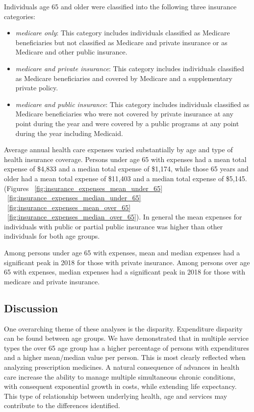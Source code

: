 \documentclass{ucetd}
\begin{document}
Individuals age 65 and older were classified into the following three insurance categories:
\begin{itemize}
  \item \textit{medicare only}: This category includes individuals classified as Medicare beneficiaries but not classified as Medicare and private insurance or as Medicare and other public insurance.
  \item \textit{medicare and private insurance}: This category includes individuals classified as Medicare beneficiaries and covered by Medicare and a supplementary private policy.
  \item \textit{medicare and public insurance}: This category includes individuals classified as Medicare beneficiaries who were not covered by private insurance at any point during the year and were covered by a public programs at any point during the year including Medicaid.
\end{itemize}

Average annual health care expenses varied substantially by age and type of health insurance coverage. Persons under age 65 with expenses had a mean total expense of \$4,833 and a median total expense of \$1,174, while those 65 years and older had a mean total expense of \$11,403 and a median total expense of \$5,145. (Figures ~\ref{fig:insurance_expenses_mean_under_65} ~\ref{fig:insurance_expenses_median_under_65} ~\ref{fig:insurance_expenses_mean_over_65} ~\ref{fig:insurance_expenses_median_over_65}). In general the mean expenses for individuals with public or partial public insurance was higher than other individuals for both age groups. 

Among persons under age 65 with expenses, mean and median expenses had a significant peak in 2018 for those with private insurance. Among persons over age 65 with expenses, median expenses had a significant peak in 2018 for those with medicare and private insurance. 

\subsection{ Discussion}
One overarching theme of these analyses is the disparity. Expenditure disparity can be found between age groups. We have demonstrated that in multiple service types the over 65 age group has a higher percentage of persons with expenditures and a higher mean/median value per person. This is most clearly reflected when analyzing prescription medicines. A natural consequence of advances in health care increase the ability to manage multiple simultaneous chronic conditions, with consequent exponential growth in costs, while extending life expectancy. This type of relationship between underlying health, age and services may contribute to the differences identified.
\end{document}
